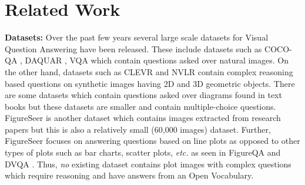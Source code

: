 \documentclass[10pt,twocolumn,letterpaper]{article}
\begin{document}
\section{Related Work}

\noindent\textbf{Datasets:} 
Over the past few years several large scale datasets for Visual Question Answering have been released. 
These include datasets such as COCO-QA \cite{RenKZ15}, DAQUAR \cite{MalinowskiF14}, VQA \cite{AntolALMBZP15,GoyalKSBP17} which contain questions asked over natural images. 
On the other hand, datasets such as CLEVR \cite{JohnsonHMFZG17} and NVLR \cite{SuhrLYA17} contain complex reasoning based questions on synthetic images having 2D and 3D geometric objects.  
There are some datasets \cite{KembhaviSKSHF16,KembhaviSSCFH17} which contain questions asked over diagrams found in text books but these datasets are smaller and contain multiple-choice questions. 
FigureSeer \cite{SiegelHLDF16} is another dataset which contains images extracted from research papers but this is also a relatively small (60,000 images) dataset. 
Further, FigureSeer focuses on answering questions based on line plots as opposed to other types of plots such as bar charts, scatter plots, \textit{etc.} as seen in %
FigureQA \cite{FQA} and DVQA  \cite{DVQA}. 
Thus, \emph{no} existing dataset contains plot images with complex questions which require reasoning and have answers from an Open Vocabulary.
\end{document}

